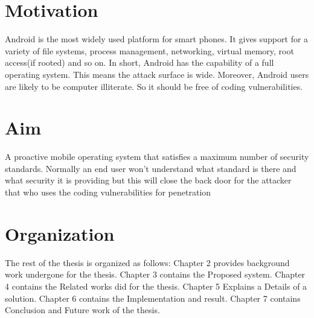 \section{Motivation}
Android is the most widely used platform for smart phones. It gives support for a variety
of file systems, process management, networking, virtual memory, root access(if rooted) and so on. In short, Android has the capability of a full operating system.  This means the attack surface is wide. Moreover, Android users are likely to be computer illiterate. So it should be free of coding vulnerabilities.

\section{Aim}
A proactive mobile operating system that satisfies a maximum number of security standards. Normally an end user won't understand what standard is there and what security it is providing but
this will close the back door for the attacker that who uses the coding vulnerabilities for penetration   
\section{Organization}
The rest of the thesis is organized as follows: Chapter 2 provides background work undergone for the
thesis. Chapter 3 contains the Proposed system. Chapter 4 contains the Related works did for the thesis.
Chapter 5 Explains a Details of a solution. Chapter 6 contains the Implementation and result. Chapter 7 contains Conclusion and Future work of the thesis.
